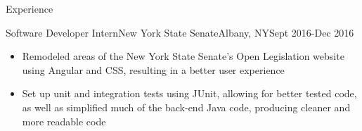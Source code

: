\documentclass[]{xjavathehutt}
\begin{document}
\begin{cvsection}{Experience}
  \begin{cvsubsection}{Software Developer Intern}{New York State Senate}{Albany, NY}{Sept 2016-Dec 2016}
    \begin{itemize}
      \item{Remodeled areas of the New York State Senate's Open Legislation website using Angular
        and CSS, resulting in a better user experience}
      \item{Set up unit and integration tests using JUnit, allowing for better tested code, as well
        as simplified much of the back-end Java code, producing cleaner and more readable code}
    \end{itemize}
  \end{cvsubsection}
\end{cvsection}


\end{document}
